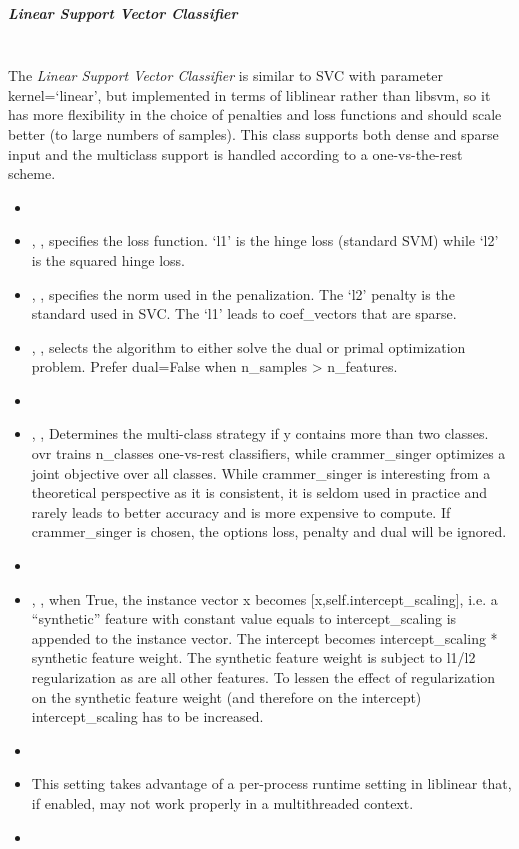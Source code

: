 \subparagraph{Linear Support Vector Classifier}
\mbox{}
\\The \textit{Linear Support Vector Classifier} is similar to SVC with parameter
kernel=`linear', but implemented in terms of liblinear rather than libsvm,
so it has more flexibility in the choice of penalties and loss functions and
should scale better (to large numbers of samples).
%
This class supports both dense and sparse input and the multiclass support is
handled according to a one-vs-the-rest scheme.
%
\begin{itemize}
  \item {}
  \item {}, , specifies the loss
  function.
  `l1' is the hinge loss (standard SVM) while `l2' is the squared hinge
  loss.
  \item {}, , specifies the norm
  used in the penalization.
  The `l2' penalty is the standard used in SVC.
  The `l1' leads to coef\_vectors that are sparse.
  \item {}, , selects the algorithm to either solve
  the dual or primal optimization problem.
  Prefer dual=False when n\_samples > n\_features.
  \item \tolSVMDescription{}
  \item {}, ,
  Determines the multi-class strategy if y contains more than two classes.
  ovr trains n\_classes one-vs-rest classifiers, while
  crammer\_singer optimizes a joint objective over all classes.
  While crammer\_singer is interesting from a theoretical perspective as it is
  consistent, it is seldom used in practice and rarely leads to better accuracy
  and is more expensive to compute.
  If crammer\_singer is chosen, the options loss, penalty and dual
  will be ignored.
  \item {}
  \item {}, , when
  True, the instance vector x becomes [x,self.intercept\_scaling], i.e. a 
  ``synthetic'' feature with constant value equals to intercept\_scaling is
  appended to the instance vector.
  The intercept becomes intercept\_scaling * synthetic feature
  weight.
  \nb The synthetic feature weight is subject to l1/l2 regularization as are all
  other features.
  To lessen the effect of regularization on the synthetic feature weight (and
  therefore on the intercept) intercept\_scaling has to be increased.
  \item \classWeightDescription{}
  \item \verDescriptionB{}
  \nb This setting takes advantage of a per-process runtime setting in liblinear 
  that, if enabled, may not work properly in a multithreaded context.
  \item {}
\end{itemize}

